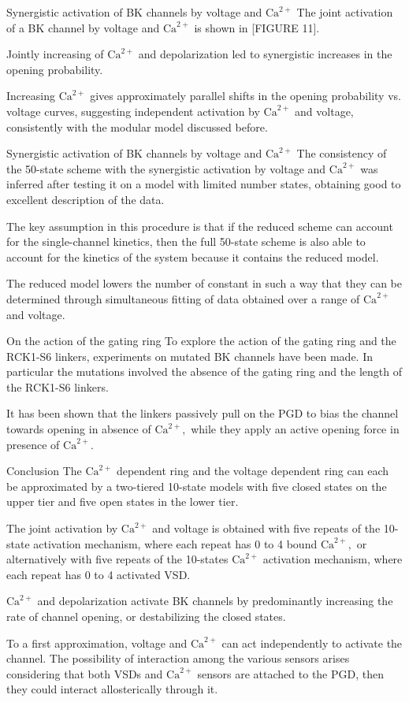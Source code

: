 \documentclass{beamer}
\newcommand{\ca}{\text{Ca}^{2+}}
\begin{document}
\begin{frame}{Synergistic activation of BK channels by voltage and $\ca$}
The joint activation of a BK channel by voltage and $\ca$ is shown in [FIGURE 11].

Jointly increasing of $\ca$ and depolarization led to synergistic increases in the opening probability.

Increasing $\ca$ gives approximately parallel shifts in the opening probability vs. voltage curves, suggesting independent activation by $\ca$ and voltage, consistently with the modular model discussed before.
\end{frame}

\begin{frame}{Synergistic activation of BK channels by voltage and $\ca$}
The consistency of the 50-state scheme with the synergistic activation by voltage and $\ca$ was inferred after testing it on a model with limited number states, obtaining good to excellent description of the data.

The key assumption in this procedure is that if the reduced scheme can account for the single-channel kinetics, then the full 50-state scheme is also able to account for the kinetics of the system because it contains the reduced model.

The reduced model lowers the number of constant in such a way that they can be determined through simultaneous fitting of data obtained over a range of $\ca$ and voltage.
\end{frame}

\begin{frame}{On the action of the gating ring}
To explore the action of the gating ring and the RCK1-S6 linkers, experiments on mutated BK channels have been made.
In particular the mutations involved the absence of the gating ring and the length of the RCK1-S6 linkers.

It has been shown that the linkers passively pull on the PGD to bias the channel towards opening in absence of $\ca,$ while they apply an active opening force in  presence of $\ca.$
\end{frame}

\begin{frame}{Conclusion}
The $\ca$ dependent ring and the voltage dependent ring can each be approximated by a two-tiered 10-state models with five closed states on the upper tier and five open states in the lower tier.

The joint activation by $\ca$ and voltage is obtained with five repeats of the 10-state activation mechanism, where each repeat has 0 to 4 bound $\ca,$ or alternatively with five repeats of the 10-states $\ca$ activation mechanism, where each repeat has 0 to 4 activated VSD.

$\ca$ and depolarization activate BK channels by predominantly increasing the rate of channel opening, or destabilizing the closed states.

To a first approximation, voltage and $\ca$ can act independently to activate the channel.
The possibility of interaction among the various sensors arises considering that both VSDs and $\ca$ sensors are attached to the PGD, then they could interact allosterically through it.
\end{frame}
\end{document}
